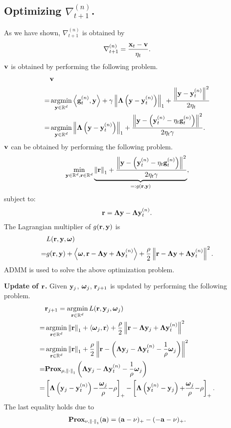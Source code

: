 \documentclass[journal]{IEEEtran}
\begin{document}
\subsection{Optimizing $\nabla_{t+1}^{(n)}$.}
As we have shown, $\nabla_{t+1}^{(n)}$ is obtained by 
\begin{align}
\nonumber
\nabla_{t+1}^{(n)} = \frac{{\bf x}_t - {\bf v}}{\eta_t}.
\end{align} ${\bf v}$ is obtained by performing the following problem.
\begin{align}
\nonumber
& \v \\ \nonumber
= & \argmin_{\y\in\RR^d} \lrangle {\g^{(n)}_t, \y} + \gamma \lrnorm{\bLambda\lrincir{\y - \y_t^{(n)}}}_1 + \frac{\lrnorm{\y - \y_t^{(n)}}^2}{2\eta_t} \\ \nonumber
= & \argmin_{\y\in\RR^d} \lrnorm{\bLambda\lrincir{\y - \y_t^{(n)}}}_1 + \frac{\lrnorm{\y - \lrincir{\y_t^{(n)} - \eta_t\g_t^{(n)}}}^2}{2\eta_t\gamma}.
\end{align} ${\bf v}$ can be obtained by performing the following problem.
\begin{align}
\nonumber
\min_{{\bf y}\in\mathbb{R}^d, {\bf r}\in\mathbb{R}^d} \underbrace{\left\lVert{\bf r}\right\rVert_1 + \frac{\left\lVert{\bf y} - \left( {\bf y}_t^{(n)} - \eta_t{\bf g}_t^{(n)} \right)\right\rVert^2}{2\eta_t\gamma}}_{=: g({\bf r}, {\bf y})},
\end{align} subject to:
\begin{align}
\nonumber
{\bf r} = \mathbf{\Lambda} {\bf y} - \mathbf{\Lambda} {\bf y}_t^{(n)}.
\end{align} The Lagrangian multiplier of $g({\bf r}, {\bf y})$ is 
\begin{align}
\nonumber
& L({\bf r}, {\bf y}, \boldsymbol{\omega})  \\ \nonumber
= & g({\bf r}, {\bf y}) + \left\langle\boldsymbol{\omega}, {\bf r} - \mathbf{\Lambda} {\bf y} + \mathbf{\Lambda}{\bf y}_t^{(n)} \right\rangle + \frac{\rho}{2}\left\lVert{\bf r} - \mathbf{\Lambda} {\bf y} + \mathbf{\Lambda}{\bf y}_t^{(n)}\right\rVert^2.
\end{align} ADMM\cite{xx} is used to solve the above optimization problem.

\textbf{Update of ${\bf r}$.} Given ${\bf y}_j$, $\boldsymbol{\omega}_j$, ${\bf r}_{j+1}$ is updated by performing the following problem.
\begin{align}
\nonumber
&\r_{j+1} = \argmin_{\r\in\RR^d} L(\r, \y_j, \bomega_j) \\ \nonumber
= & \argmin_{\r\in\RR^d} \lrnorm{\r}_1 + \lrangle{\bomega_j, \r} + \frac{\rho}{2}\lrnorm{\r - \bLambda \y_j + \bLambda\y_t^{(n)}}^2 \\ \nonumber
= & \argmin_{\r\in\RR^d} \lrnorm{\r}_1 + \frac{\rho}{2}\lrnorm{\r - \lrincir{\bLambda \y_j - \bLambda\y_t^{(n)} - \frac{1}{\rho}\bomega_j}}^2 \\ \nonumber
= & \Prox_{\rho, \lrnorm{\cdot}_1}\lrincir{\bLambda \y_j - \bLambda\y_t^{(n)} - \frac{1}{\rho}\bomega_j} \\ \nonumber
= & \left[\bLambda \lrincir{\y_j - \y_t^{(n)}} \mathrm{-} \frac{\bomega_j}{\rho} \mathrm{-} \rho\right]_\mathrm{+}  \mathrm{-} \left[\bLambda \lrincir{\y_t^{(n)} - \y_j} \mathrm{+} \frac{\bomega_j}{\rho} \mathrm{-} \rho\right]_\mathrm{+}.
\end{align} The last equality holds due to
\begin{align}
\nonumber
\textbf{Prox}_{\nu, \left\lVert\cdot\right\rVert_1}({\bf a}) = ({\bf a} - \nu)_+ - (-{\bf a} - \nu)_+.
\end{align}
\end{document}
